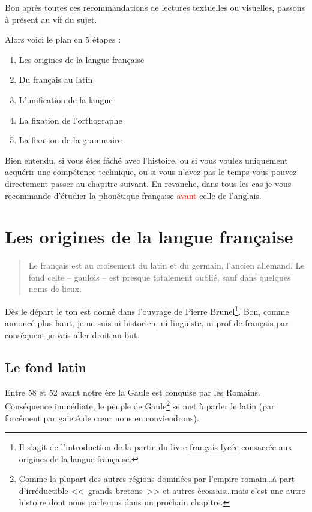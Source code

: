 Bon après toutes ces recommandations de lectures textuelles ou
visuelles, passons à présent au vif du sujet.\par

Alors voici le plan en 5 étapes :

\begin{enumerate}
\item Les origines de la langue française
\item Du français au latin
\item L'unification de la langue
\item La fixation de l'orthographe
\item La fixation de la grammaire
\end{enumerate}

Bien entendu, si vous êtes fâché avec l'histoire, ou si vous voulez
uniquement acquérir une compétence technique, ou si vous n'avez pas le
temps vous pouvez directement passer au chapitre suivant. En revanche,
dans tous les cas je vous recommande d'étudier la phonétique française
\textcolor{red}{avant} celle de l'anglais.

\section{Les origines de la langue française}\label{sec:orgfr}

\begin{quote}
  Le français est au croisement du latin et du germain, l'ancien
  allemand. Le fond celte -- gaulois -- est presque totalement oublié,
  sauf dans quelques noms de lieux.
\end{quote}

Dès le départ le ton est donné dans l'ouvrage de Pierre
Brunel\footnote{Il s'agit de l'introduction  de la partie du livre \href{https://www.amazon.fr/gp/product/2844100015/ref=as\_li\_tl?ie=UTF8\&camp=1642\&creative=6746\&creativeASIN=2844100015\&linkCode=as2\&tag=wwwbecomefree-21\&linkId=985f3a849fd44728e8480993cf2d5490}{français
  lycée} consacrée aux origines de la langue française.}. Bon, comme
annoncé plus haut, je ne suis ni historien, ni linguiste, ni prof de
français par conséquent je vais aller droit au but.\par

\subsection{Le fond latin}\label{subsec:lat}

Entre 58 et 52 avant notre ère la Gaule est conquise par les
Romains. Conséquence immédiate, le peuple de Gaule\footnote{Comme la
  plupart des autres régions dominées par l'empire romain\dots à part
  d'irréductible <<~grands-bretons~>> et autres écossais\dots mais
  c'est une autre histoire dont nous parlerons dans un prochain
  chapitre.} se met à parler le latin (par forcément par gaieté de
c{\oe}ur nous en conviendrons).\par

